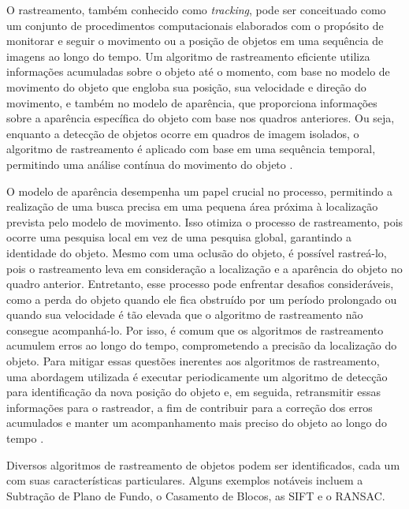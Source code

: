 O rastreamento, também conhecido como \textit{tracking}, pode ser conceituado como um conjunto de procedimentos computacionais elaborados com o propósito de monitorar e seguir o movimento ou a posição de objetos em uma sequência de imagens ao longo do tempo. Um algoritmo de rastreamento eficiente utiliza informações acumuladas sobre o objeto até o momento, com base no modelo de movimento do objeto que engloba sua posição, sua velocidade e direção do movimento, e também no modelo de aparência, que proporciona informações sobre a aparência específica do objeto com base nos quadros anteriores. Ou seja, enquanto a detecção de objetos ocorre em quadros de imagem isolados, o algoritmo de rastreamento é aplicado com base em uma sequência temporal, permitindo uma análise contínua do movimento do objeto \cite{tracking}.

O modelo de aparência desempenha um papel crucial no processo, permitindo a realização de uma busca precisa em uma pequena área próxima à localização prevista pelo modelo de movimento. Isso otimiza o processo de rastreamento, pois ocorre uma pesquisa local em vez de uma pesquisa global, garantindo a identidade do objeto. Mesmo com uma oclusão do objeto, é possível rastreá-lo, pois o rastreamento leva em consideração a localização e a aparência do objeto no quadro anterior. Entretanto, esse processo pode enfrentar desafios consideráveis, como a perda do objeto quando ele fica obstruído por um período prolongado ou quando sua velocidade é tão elevada que o algoritmo de rastreamento não consegue acompanhá-lo. Por isso, é comum que os algoritmos de rastreamento acumulem erros ao longo do tempo, comprometendo a precisão da localização do objeto. Para mitigar essas questões inerentes aos algoritmos de rastreamento, uma abordagem utilizada é executar periodicamente um algoritmo de detecção para identificação da nova posição do objeto e, em seguida, retransmitir essas informações para o rastreador, a fim de contribuir para a correção dos erros acumulados e manter um acompanhamento mais preciso do objeto ao longo do tempo \cite{tracking}.


Diversos algoritmos de rastreamento de objetos podem ser identificados, cada um com suas características particulares. Alguns exemplos notáveis incluem a Subtração de Plano de Fundo, o Casamento de Blocos, as \ac{SIFT} e o \ac{RANSAC}.

